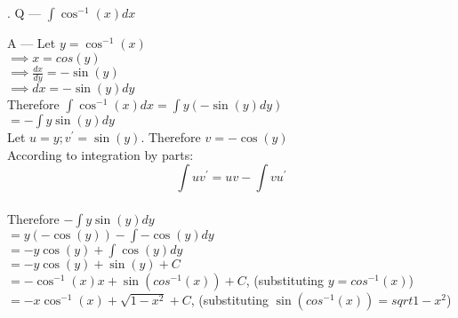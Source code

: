 \documentclass{article}
\newcounter{question}
\begin{document}
\newcommand\Que[1]{%
   \leavevmode\par
   \stepcounter{question}
   \noindent
   \thequestion. Q --- #1\par}

\newcommand\Ans[2][]{%
    \leavevmode\par\noindent
   {A --- \textbf{#1}#2\par}}

\Que{ $ \int{\cos^{-1}(x)}dx $ }
\Ans
{
Let $ y = \cos^{-1}(x) $\\

$\implies x = cos(y) $\\

$\implies \frac{dx}{dy} = -\sin(y) $\\

$\implies dx = -\sin(y) dy $\\

Therefore $ \int{\cos^{-1}(x)}dx
= \int{y(-\sin(y)dy)}$\\

$= -\int{y\sin(y) dy} $\\

Let $ u=y;v^{\prime}=\sin(y) $.
Therefore $ v= -\cos(y) $\\

According to integration by parts:\\
$$\int{uv^{\prime}}=uv-\int{vu^{\prime}}$$\\

Therefore $ -\int{y\sin(y) dy} $\\

$= y(-\cos(y)) - \int{-\cos(y) dy}$\\

$= -y\cos(y) + \int{\cos(y) dy}$\\

$= -y\cos(y) + \sin(y) + C $\\

$= -\cos^{-1}(x)x + \sin(cos^{-1}(x)) + C $, 
(substituting $ y=cos^{-1}(x) $)\\

$= -x\cos^{-1}(x) + \sqrt{1-x^2} + C $, 
(substituting $ \sin(cos^{-1}(x))=sqrt{1-x^2} $)\\

}
\end{document}
